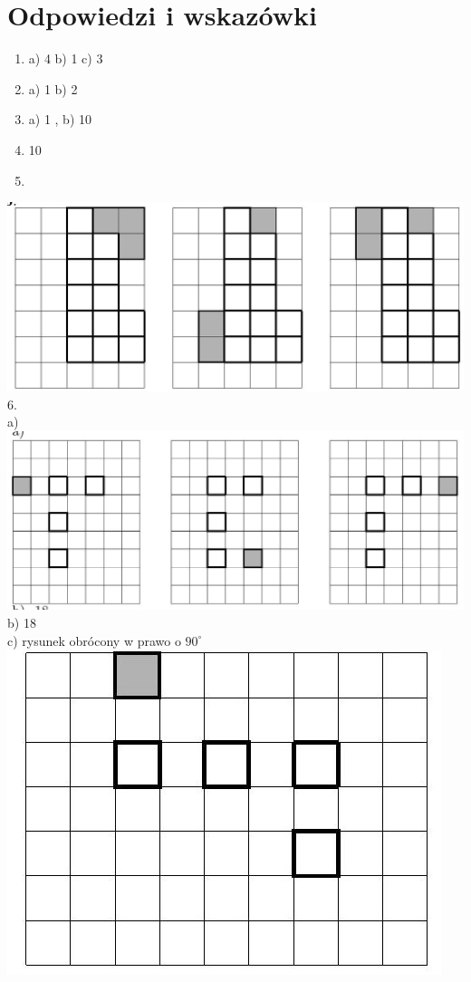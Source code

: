 \documentclass[10pt]{article}
\begin{document}
\section*{Odpowiedzi i wskazówki}
\begin{enumerate}
  \item a) 4 b) 1 c) 3
  \item a) 1 b) 2
  \item a) 1 , b) 10
  \item 10
  \item 
\end{enumerate}

\includegraphics[max width=\textwidth, center]{2024_11_21_71f62bd117d375398909g-209(1)}\\
6.\\
a)\\
\includegraphics[max width=\textwidth, center]{2024_11_21_71f62bd117d375398909g-209(2)}\\
b) 18\\
c) rysunek obrócony w prawo o \(90^{\circ}\)\\
\includegraphics[max width=\textwidth, center]{2024_11_21_71f62bd117d375398909g-209}\\
\end{document}
